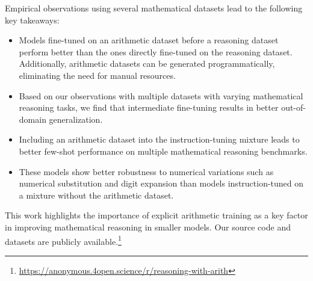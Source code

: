 Empirical observations using several mathematical datasets lead to the following key takeaways:
\begin{itemize}
    \item Models fine-tuned on an arithmetic dataset before a reasoning dataset perform better than the ones directly fine-tuned on the reasoning dataset. Additionally, arithmetic datasets can be generated programmatically, eliminating the need for manual resources.

    \item Based on our observations with multiple datasets with varying mathematical reasoning tasks, we find that intermediate fine-tuning results in better out-of-domain generalization.

    \item Including an arithmetic dataset into the instruction-tuning mixture leads to better few-shot performance on multiple mathematical reasoning benchmarks.

    \item These models show better robustness to numerical variations such as numerical substitution and digit expansion than models instruction-tuned on a mixture without the arithmetic dataset.
\end{itemize}

This work highlights the importance of explicit arithmetic training as a key factor in improving mathematical reasoning in smaller models. Our source code and datasets are publicly available.\footnote{\url{https://anonymous.4open.science/r/reasoning-with-arith}}

